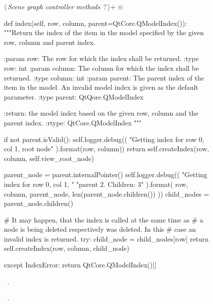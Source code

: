 \documentclass[%
    a4paper,    %
    justified,  %
    nobib,      %
    openany     %
]{tufte-book}
\begin{document}
\begin{figure}
\begin{flushleft} \small
\begin{minipage}{\linewidth}\label{scrap31}\raggedright\small
{} $\langle\,${\itshape Scene graph controller methods}\nobreak\ {\footnotesize {?}}$\,\rangle+\equiv$
\vspace{-1ex}
\begin{pythoncode}
def index(self, row, column, parent=QtCore.QModelIndex()):
    """Return the index of the item in the model specified by the
    given row, column and parent index.

    :param row: The row for which the index shall be returned.
    :type  row: int
    :param column: The column for which the index shall be
                   returned.
    :type column:  int
    :param parent: The parent index of the item in the model. An
                   invalid model index is given as the default
                   parameter.
    :type parent: QtQore.QModelIndex

    :return: the model index based on the given row, column and
             the parent index.
    :rtype: QtCore.QModelIndex
    """

    if not parent.isValid():
        self.logger.debug((
            "Getting index for row {0}, col {1}, root node"
        ).format(row, column))
        return self.createIndex(row, column, self.view_root_node)

    parent_node = parent.internalPointer()
    self.logger.debug((
        "Getting index for row {0}, col {1}, "
        "parent {2}. Children: {3}"
    ).format(
        row, column, parent_node, len(parent_node.children())
    ))
    child_nodes = parent_node.children()

    # It may happen, that the index is called at the same time as
    # a node is being deleted respectively was deleted. In this
    # case an invalid index is returned.
    try:
        child_node  = child_nodes[row]
        return self.createIndex(row, column, child_node)

    except IndexError:
        return QtCore.QModelIndex()|\NWsep|
\end{pythoncode}
\vspace{1.5ex}
\footnotesize
\begin{list}{}{\setlength{\itemsep}{-\parsep}\setlength{\itemindent}{-\leftmargin}}
\item \NWtxtMacroDefBy\ .
\item \NWtxtMacroRefIn\ .


\end{list}
\end{minipage}
\end{flushleft}
\end{figure}
\end{document}
